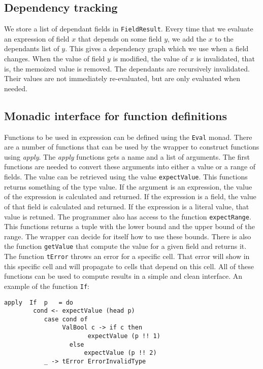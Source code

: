 \documentclass{article}
\begin{document}
	\subsection{Dependency tracking}
	We store a list of dependant fields in \texttt{FieldResult}. Every time that we evaluate an expression of field $x$ that depends on some field $y$, we add the $x$ to the dependants list of $y$. This gives a dependency graph which we use when a field changes. When the value of field $y$ is modified, the value of $x$ is invalidated, that is, the memoized value is removed. The dependants are recursively invalidated. Their values are not immediately re-evaluated, but are only evaluated when needed.
	
	\subsection{Monadic interface for function definitions}
	Functions to be used in expression can be defined using the \texttt{Eval} monad. There are a number of functions that can be used by the wrapper to construct functions using \textit{apply}. The \textit{apply} functions gets a name and a list of arguments. The first functions are needed to convert these arguments into either a value or a range of fields. The value can be retrieved using the value \texttt{expectValue}. This functions returns something of the type value. If the argument is an expression, the value of the expression is calculated and returned. If the expression is a field, the value of that field is calculated and returned. If the expression is a literal value, that value is retuned. The programmer also has access to the function \texttt{expectRange}. This functions returns a tuple with the lower bound and the upper bound of the range. The wrapper can decide for itself how to use these bounds. There is also the function \texttt{getValue} that compute the value for a given field and returns it. The function \texttt{tError} throws an error for a specific cell. That error will show in this specific cell and will propagate to cells that depend on this cell. All of these functions can be used to compute results in a simple and clean interface. An example of the function \texttt{If}:
\begin{verbatim}
apply  If  p   = do
		cond <- expectValue (head p)
           case cond of
                ValBool c -> if c then
              		   expectValue (p !! 1)
           		  else
               		  expectValue (p !! 2)
           _ -> tError ErrorInvalidType                  	
\end{verbatim}	
\end{document}
